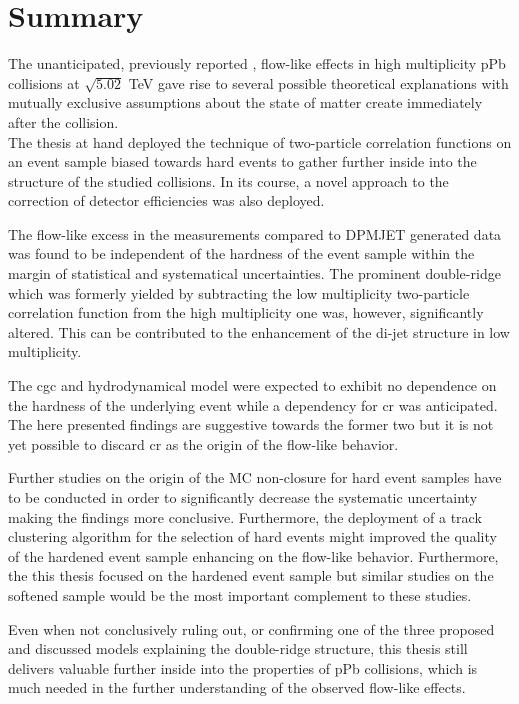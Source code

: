 
\chapter{Summary}
\label{chap:summary}

The unanticipated, previously reported \cite{Abelev2012,CMSCollaborationChatrchyan2013}, flow-like effects in high multiplicity \gls{pPb} collisions at $\sqrt{5.02}$ \si{TeV} gave rise to several possible theoretical explanations with mutually exclusive assumptions about the state of matter create immediately after the collision.\\

The thesis at hand deployed the technique of two-particle correlation functions on an event sample biased towards hard events to gather further inside into the structure of the studied collisions. In its course, a novel approach to the correction of detector efficiencies was also deployed.

The flow-like excess in the measurements compared to DPMJET generated data was found to be independent of the hardness of the event sample within the margin of statistical and systematical uncertainties. The prominent double-ridge which was formerly yielded by subtracting the low multiplicity two-particle correlation function from the high multiplicity one was, however, significantly altered. This can be contributed to the enhancement of the di-jet structure in low multiplicity.

The \gls{cgc} and hydrodynamical model were expected to exhibit no dependence on the hardness of the underlying event while a dependency for \gls{cr} was anticipated. The here presented findings are suggestive towards the former two but it is not yet possible to discard \gls{cr} as the origin of the flow-like behavior.

Further studies on the origin of the MC non-closure for hard event samples have to be conducted in order to significantly decrease the systematic uncertainty making the findings more conclusive. Furthermore, the deployment of a track clustering algorithm for the selection of hard events might improved the quality of the hardened event sample enhancing on the flow-like behavior. Furthermore, the this thesis focused on the hardened event sample but similar studies on the softened sample would be the most important complement to these studies.

Even when not conclusively ruling out, or confirming one of the three proposed and discussed models explaining the double-ridge structure, this thesis still delivers valuable further inside into the properties of \gls{pPb} collisions, which is much needed in the further understanding of the observed flow-like effects.

